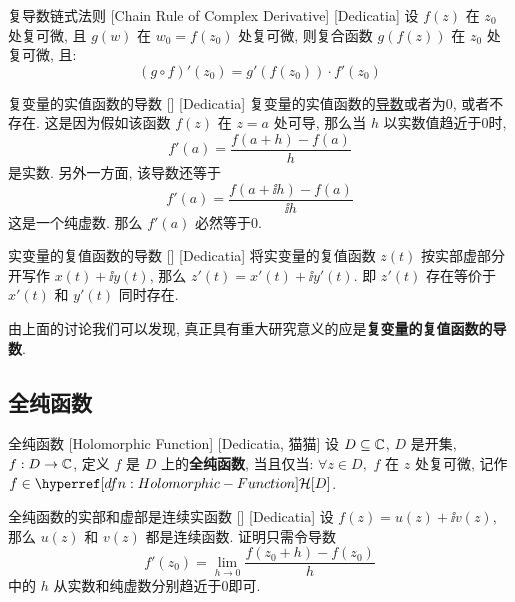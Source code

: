         \begin{ppt}
            {复导数链式法则}
            [Chain Rule of Complex Derivative]
            [Dedicatia]
            设 \(f(z)\) 在 \(z_0\) 处复可微, 且 \(g(w)\) 在 \(w_0=f(z_0)\) 处复可微, 则复合函数 \(g(f(z))\) 在 \(z_0\) 处复可微, 且:
            \[(g\circ f)'(z_0)=g'(f(z_0))\cdot f'(z_0)\]
        \end{ppt}

        \begin{crl}
            {复变量的实值函数的导数}
            []
            [Dedicatia]
            复变量的实值函数的\hyperref[dfn:Complex-Derivative]{导数}或者为0, 或者不存在. 这是因为假如该函数 \(f(z)\) 在 \(z=a\) 处可导, 那么当 \(h\) 以实数值趋近于0时, 
            \[f'(a)=\frac{f(a+h)-f(a)}{h}\]
            是实数. 另外一方面, 该导数还等于
            \[f'(a)=\frac{f(a+\ii h)-f(a)}{\ii h}\]
            这是一个纯虚数. 那么 \(f'(a)\) 必然等于0.
        \end{crl}

        \begin{xmp}
            {实变量的复值函数的导数}
            []
            [Dedicatia]
            将实变量的复值函数 \(z(t)\) 按实部虚部分开写作 \(x(t)+\ii y(t)\), 那么 \(z'(t)=x'(t)+\ii y'(t)\). 即 \(z'(t)\) 存在等价于 \(x'(t)\) 和 \(y'(t)\) 同时存在. 
        \end{xmp}
        
        \begin{rmk}
            [Dedicatia]
            由上面的讨论我们可以发现, 真正具有重大研究意义的应是\textbf{复变量的复值函数的导数}. 
        \end{rmk}

    \subsection{全纯函数}

        \begin{dfn}
            {全纯函数}
            [Holomorphic Function]
            [Dedicatia, 猫猫]
            设 \(D\subseteq\operatorname{\mathbb{C}}\), \(D\) 是开集, \(f:D\to\operatorname{\mathbb{C}}\), 定义 \(f\) 是 \(D\) 上的\textbf{全纯函数}, 当且仅当: \(\forall z\in D,\) \(f\) 在 \(z\) 处复可微, 记作 \(f\in\Holo[D]\). 
        \end{dfn}

        \begin{ppt}
            {全纯函数的实部和虚部是连续实函数}
            []
            [Dedicatia]
            设 \(f(z)=u(z)+\ii v(z)\), 那么 \(u(z)\) 和 \(v(z)\) 都是连续函数. 证明只需令导数
            \[f'(z_0)=\lim_{h\to 0}\frac{f(z_0+h)-f(z_0)}{h}\]
            中的 \(h\) 从实数和纯虚数分别趋近于0即可. 
        \end{ppt}

